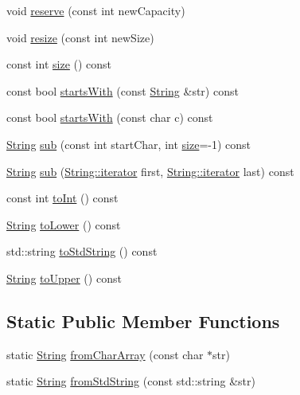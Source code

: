 \begin{DoxyCompactItemize}
\item 
void \hyperlink{classprism_1_1_string_aed752cc8c9e59a7b2366b85ab20a656b}{reserve} (const int new\+Capacity)
\item 
void \hyperlink{classprism_1_1_string_a77b3580eba01007afc7089cfd334abd5}{resize} (const int new\+Size)
\item 
const int \hyperlink{classprism_1_1_string_a603b5a90681d43adf7c6c29018e0300c}{size} () const 
\item 
const bool \hyperlink{classprism_1_1_string_ae9ce1b5a274fc4b672944da555552456}{starts\+With} (const \hyperlink{classprism_1_1_string}{String} \&str) const 
\item 
const bool \hyperlink{classprism_1_1_string_a5ce3cf5ba78faa6c9179fb777cc4c6ac}{starts\+With} (const char c) const 
\item 
\hyperlink{classprism_1_1_string}{String} \hyperlink{classprism_1_1_string_a4249170c6ee2d8d409e7b2c1c66092e4}{sub} (const int start\+Char, int \hyperlink{classprism_1_1_string_a603b5a90681d43adf7c6c29018e0300c}{size}=-\/1) const 
\item 
\hyperlink{classprism_1_1_string}{String} \hyperlink{classprism_1_1_string_acb6b7f719571cccca2f08887e61ed2a5}{sub} (\hyperlink{classprism_1_1_string_adacc7975837e5fff95d70690777fb330}{String\+::iterator} first, \hyperlink{classprism_1_1_string_adacc7975837e5fff95d70690777fb330}{String\+::iterator} last) const 
\item 
const int \hyperlink{classprism_1_1_string_afbf22d03096777ef6909794edc18a0f9}{to\+Int} () const 
\item 
\hyperlink{classprism_1_1_string}{String} \hyperlink{classprism_1_1_string_ac75330b46da019ccf2c964e4c2fd9f81}{to\+Lower} () const 
\item 
std\+::string \hyperlink{classprism_1_1_string_ad1018741610a6723a38ab52255147ac4}{to\+Std\+String} () const 
\item 
\hyperlink{classprism_1_1_string}{String} \hyperlink{classprism_1_1_string_afd1fc3691cbc2f267fc3d1d8f27d2c3a}{to\+Upper} () const 
\end{DoxyCompactItemize}
\subsection*{Static Public Member Functions}
\begin{DoxyCompactItemize}
\item 
static \hyperlink{classprism_1_1_string}{String} \hyperlink{classprism_1_1_string_a11d319bfb0bf70ffdf71d2fc65b963db}{from\+Char\+Array} (const char $\ast$str)
\item 
static \hyperlink{classprism_1_1_string}{String} \hyperlink{classprism_1_1_string_a8692b9a7e4c25f349bb83b53ff3d6f36}{from\+Std\+String} (const std\+::string \&str)
\end{DoxyCompactItemize}
